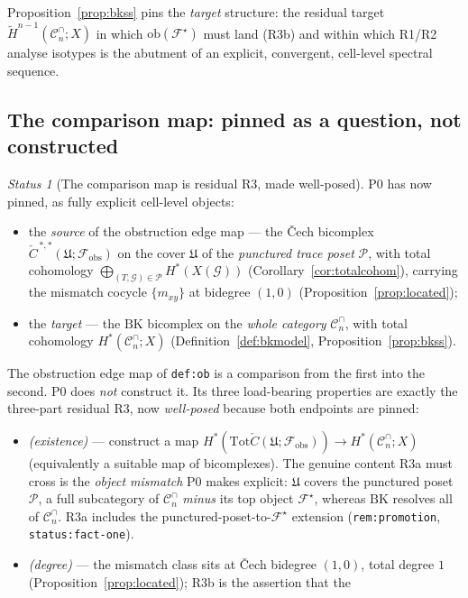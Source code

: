 \documentclass[11pt,oneside]{amsart}
\theoremstyle{plain}
\theoremstyle{definition}
\theoremstyle{remark}
\theoremstyle{honeststyle}
\newtheorem{status}[theorem]{Status}
\newcommand{\F}{\mathcal{F}}
\newcommand{\G}{\mathcal{G}}
\newcommand{\Fstar}{\F^{\star}}
\newcommand{\Cn}{\mathcal{C}^{\cap}_n}
\newcommand{\ob}{\mathrm{ob}}
\newcommand{\BK}{\mathrm{BK}}
\newcommand{\Tot}{\mathrm{Tot}}
\newcommand{\fobs}{\mathcal{F}_{\mathrm{obs}}}
\newcommand{\Pp}{\mathcal{P}}
\newcommand{\Uf}{\mathfrak{U}}
\newcommand{\Ccheck}{\check{C}}
\begin{document}
Proposition~\ref{prop:bkss} pins the \emph{target} structure: the
residual target $\widetilde H^{n-1}(\Cn;X)$ in which $\ob(\Fstar)$
must land (R3b) and within which R1/R2 analyse isotypes is the
abutment of an explicit, convergent, cell-level spectral sequence.

\subsection{The comparison map: pinned as a question, not constructed}
\label{ssec:comparison}

\begin{status}[The comparison map is residual R3, made well-posed]
\label{status:comparison}
P0 has now pinned, as fully explicit cell-level objects:
\begin{itemize}[leftmargin=1.6em]
\item the \emph{source} of the obstruction edge map --- the \v{C}ech
  bicomplex $\Ccheck^{\,*,*}(\Uf;\fobs)$ on the cover $\Uf$ of the
  \emph{punctured trace poset} $\Pp$, with total cohomology
  $\bigoplus_{(T,\G)\in\Pp}H^{*}(X(\G))$ (Corollary~\ref{cor:totalcohom}),
  carrying the mismatch cocycle $\{m_{xy}\}$ at bidegree $(1,0)$
  (Proposition~\ref{prop:located});
\item the \emph{target} --- the $\BK$ bicomplex on the \emph{whole
  category} $\Cn$, with total cohomology $H^{*}(\Cn;X)$
  (Definition~\ref{def:bkmodel}, Proposition~\ref{prop:bkss}).
\end{itemize}
The obstruction edge map of \texttt{def:ob} is a comparison from the
first into the second. P0 does \emph{not} construct it. Its three
load-bearing properties are exactly the three-part residual R3, now
\emph{well-posed} because both endpoints are pinned:
\begin{itemize}[leftmargin=1.6em]
\item[\textbf{R3a}] \emph{(existence)} --- construct a map
  $H^{*}(\Tot\Ccheck(\Uf;\fobs))\to H^{*}(\Cn;X)$ (equivalently a
  suitable map of bicomplexes). The genuine content R3a must cross is
  the \emph{object mismatch} P0 makes explicit: $\Uf$ covers the
  punctured poset $\Pp$, a full subcategory of $\Cn$ \emph{minus} its
  top object $\Fstar$, whereas $\BK$ resolves all of $\Cn$. R3a
  includes the punctured-poset-to-$\Fstar$ extension
  (\texttt{rem:promotion}, \texttt{status:fact-one}).
\item[\textbf{R3b}] \emph{(degree)} --- the mismatch class sits at
  \v{C}ech bidegree $(1,0)$, total degree $1$
  (Proposition~\ref{prop:located}); R3b is the assertion that the

\end{itemize}
\end{status}
\end{document}
